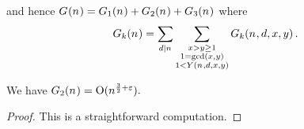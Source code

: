 and hence
  $
    \TheQuantityOf{\Size}
    =
    \TheQuantityOf[1]{\Size}
    +
    \TheQuantityOf[2]{\Size}
    +
    \TheQuantityOf[3]{\Size}
$
  where
  \[
    \TheQuantityOf[\AltIndex]{\Size}
    =
    \Sum[\TheDivisor\divides\Size]{
      \Sum[\substack{
        \LeftA>\RightA\geq 1 \\
        1 = \gcdOf{\LeftA,\RightA} \\
        1 < \UpperBoundOf{\Size,\TheDivisor,\LeftA,\RightA}
    }]{
      \TheQuantityOf[\AltIndex]{\Size,\TheDivisor,\LeftA,\RightA}
    }
  }
  .
  \]


  \begin{lemma}\label{lemma.g-two}
    We have
    \(
      \TheQuantityOf[2]{\Size}
      =
      \BigO{\Size^{\frac32 + \TheEpsilon}}
      .
    \)
  \end{lemma}
  \begin{proof} This is a straightforward computation.  
   \end{proof}

